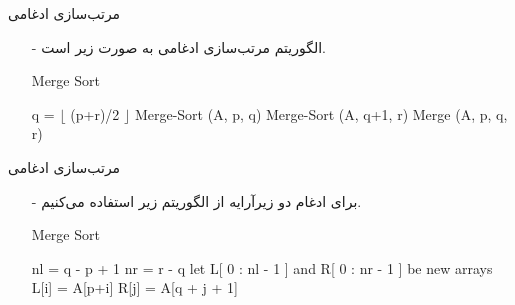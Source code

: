 \begin{frame}{‌مرتب‌سازی ادغامی}
\begin{itemize}\itemr
\item[-]
الگوریتم مرتب‌سازی ادغامی به صورت زیر است.
\begin{algorithm}[H]\alglr
  \caption{Merge Sort} 
  \begin{algorithmic}[1]
    	
    	\State \Return
    \EndIf    
    \State q = $\lfloor$ (p+r)/2 $\rfloor$	
    \State Merge-Sort (A, p, q)	
    \State Merge-Sort (A, q+1, r)	
    \State Merge (A, p, q, r) 
  \end{algorithmic}
  \label{alg:merge-sort}
\end{algorithm}
\end{itemize}
\end{frame}

\begin{frame}{‌مرتب‌سازی ادغامی}
\begin{itemize}\itemr
\item[-]
برای ادغام دو زیرآرایه از الگوریتم زیر استفاده می‌کنیم.
\begin{algorithm}[H]\alglr
  \caption{Merge Sort} 
  \begin{algorithmic}[1]
    \State nl = q - p + 1 
    \State nr = r - q 
    \State let L[ 0 : nl - 1 ] and R[ 0 : nr - 1 ] be new arrays
     
      \State L[i] = A[p+i]
    \EndFor
      
      \State R[j] = A[q + j + 1]
     \EndFor
  \end{algorithmic}
  \label{alg:merge}
\end{algorithm}
\end{itemize}
\end{frame}


